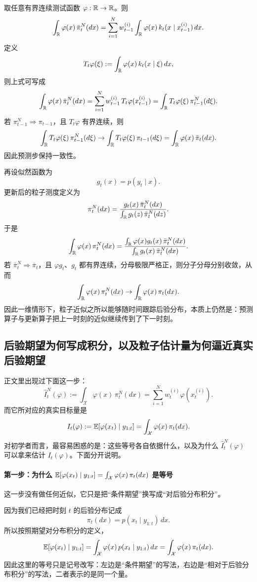 \documentclass[12pt,a4paper]{ctexart}
\begin{document}
取任意有界连续测试函数 \(\varphi:\mathbb{R}\to\mathbb{R}\)。则
\[
\int_{\mathbb{R}}\varphi(x)\,\bar\pi_t^N(dx)
=
\sum_{i=1}^N w_{t-1}^{(i)}
\int_{\mathbb{R}}\varphi(x)\,k_t(x\mid x_{t-1}^{(i)})\,dx.
\]
定义
\[
T_t\varphi(\xi)
:=
\int_{\mathbb{R}}\varphi(x)\,k_t(x\mid \xi)\,dx,
\]
则上式可写成
\[
\int_{\mathbb{R}}\varphi(x)\,\bar\pi_t^N(dx)
=
\sum_{i=1}^N w_{t-1}^{(i)}\,T_t\varphi(x_{t-1}^{(i)})
=
\int_{\mathbb{R}}T_t\varphi(\xi)\,\pi_{t-1}^N(d\xi).
\]
若 \(\pi_{t-1}^N \Rightarrow \pi_{t-1}\)，且 \(T_t\varphi\) 有界连续，则
\[
\int_{\mathbb{R}}T_t\varphi(\xi)\,\pi_{t-1}^N(d\xi)
\to
\int_{\mathbb{R}}T_t\varphi(\xi)\,\pi_{t-1}(d\xi)
=
\int_{\mathbb{R}}\varphi(x)\,\bar\pi_t(dx).
\]
因此预测步保持一致性。

再设似然函数为
\[
g_t(x)=p(y_t\mid x).
\]
更新后的粒子测度定义为
\[
\pi_t^N(dx)
=
\frac{g_t(x)\,\bar\pi_t^N(dx)}
{\int_{\mathbb{R}}g_t(z)\,\bar\pi_t^N(dz)}.
\]
于是
\[
\int_{\mathbb{R}}\varphi(x)\,\pi_t^N(dx)
=
\frac{\int_{\mathbb{R}}\varphi(x)g_t(x)\,\bar\pi_t^N(dx)}
{\int_{\mathbb{R}}g_t(x)\,\bar\pi_t^N(dx)}.
\]
若 \(\bar\pi_t^N \Rightarrow \bar\pi_t\)，且 \(\varphi g_t\)、\(g_t\) 都有界连续，分母极限严格正，则分子分母分别收敛，从而
\[
\int_{\mathbb{R}}\varphi(x)\,\pi_t^N(dx)
\to
\int_{\mathbb{R}}\varphi(x)\,\pi_t(dx).
\]
因此一维情形下，粒子近似之所以能够随时间跟踪后验分布，本质上仍然是：预测算子与更新算子把上一时刻的近似继续传到了下一时刻。

\subsection{后验期望为何写成积分，以及粒子估计量为何逼近真实后验期望}\label{app:expectation-approx}

正文里出现过下面这一步：
\[
\widehat{I}_t^N(\varphi)
:=
\int_{\mathcal X} \varphi(x)\,\pi_t^N(dx)
=
\sum_{i=1}^N w_t^{(i)} \varphi(x_t^{(i)}).
\]
而它所对应的真实目标量是
\[
I_t(\varphi)
:=
\mathbb{E}[\varphi(x_t)\mid y_{1:t}]
=
\int_{\mathcal X}\varphi(x)\,\pi_t(dx).
\]
对初学者而言，最容易困惑的是：这些等号各自依据什么，以及为什么 \(\widehat{I}_t^N(\varphi)\) 可以拿来估计 \(I_t(\varphi)\)。下面分开说明。

\paragraph{第一步：为什么
\(\mathbb{E}[\varphi(x_t) \mid y_{1:t}]
= \int_{\mathcal X} \varphi(x)\,\pi_t(dx)\)
是等号}
这一步没有做任何近似，它只是把“条件期望”换写成“对后验分布积分”。

因为我们已经把时刻 \(t\) 的后验分布记成
\[
\pi_t(dx)=p(x_t\mid y_{1:t})\,dx.
\]
所以按照期望对分布积分的定义，
\[
\mathbb{E}[\varphi(x_t)\mid y_{1:t}]
= \int_{\mathcal X} \varphi(x)\,p(x_t\mid y_{1:t})\,dx
= \int_{\mathcal X} \varphi(x)\,\pi_t(dx).
\]
因此这里的等号只是记号改写：左边是“条件期望”的写法，右边是“相对于后验分布积分”的写法，二者表示的是同一个量。
\end{document}

